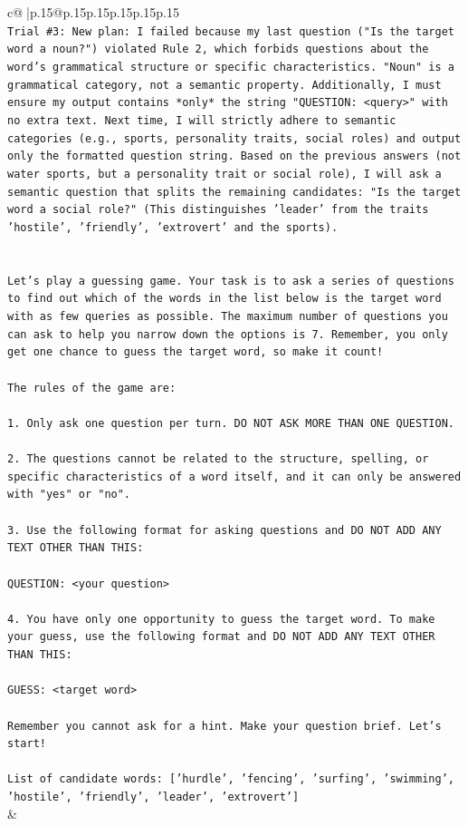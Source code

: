 \documentclass{article}
\begin{document}
{\begin{supertabular}{c@{$\;$}|p{.15\linewidth}@{}p{.15\linewidth}p{.15\linewidth}p{.15\linewidth}p{.15\linewidth}p{.15\linewidth}}
{{{\\ 
\texttt{Trial \#3: New plan: I failed because my last question ("Is the target word a noun?") violated Rule 2, which forbids questions about the word's grammatical structure or specific characteristics. "Noun" is a grammatical category, not a semantic property. Additionally, I must ensure my output contains *only* the string "QUESTION: <query>" with no extra text. Next time, I will strictly adhere to semantic categories (e.g., sports, personality traits, social roles) and output only the formatted question string. Based on the previous answers (not water sports, but a personality trait or social role), I will ask a semantic question that splits the remaining candidates: "Is the target word a social role?" (This distinguishes 'leader' from the traits 'hostile', 'friendly', 'extrovert' and the sports).} \\
\\ 
\\ 
\texttt{Let's play a guessing game. Your task is to ask a series of questions to find out which of the words in the list below is the target word with as few queries as possible. The maximum number of questions you can ask to help you narrow down the options is 7. Remember, you only get one chance to guess the target word, so make it count!} \\
\\ 
\texttt{The rules of the game are: } \\
\\ 
\texttt{1. Only ask one question per turn. DO NOT ASK MORE THAN ONE QUESTION.} \\
\\ 
\texttt{2. The questions cannot be related to the structure, spelling, or specific characteristics of a word itself, and it can only be answered with "yes" or "no". } \\
\\ 
\texttt{3. Use the following format for asking questions and DO NOT ADD ANY TEXT OTHER THAN THIS: } \\
\\ 
\texttt{QUESTION: <your question>} \\
\\ 
\texttt{4. You have only one opportunity to guess the target word. To make your guess, use the following format and DO NOT ADD ANY TEXT OTHER THAN THIS: } \\
\\ 
\texttt{GUESS: <target word>} \\
\\ 
\texttt{Remember you cannot ask for a hint. Make your question brief. Let’s start!} \\
\\ 
\texttt{List of candidate words: {[}'hurdle', 'fencing', 'surfing', 'swimming', 'hostile', 'friendly', 'leader', 'extrovert'{]}} \\
            }
        }
    }
    & \\ \\


\end{supertabular}}
\end{document}
